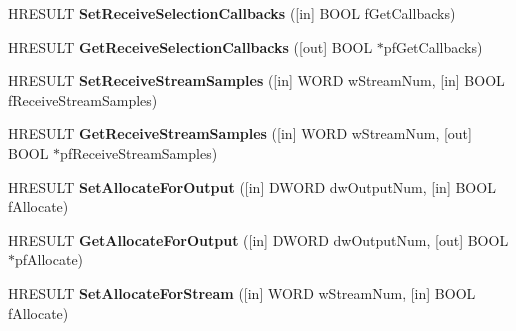 \begin{DoxyCompactItemize}
\item 
\mbox{\label{interface_i_w_m_reader_advanced_ad6e00976a9402abc437f362dbe818175}} 
H\+R\+E\+S\+U\+LT {\bfseries Set\+Receive\+Selection\+Callbacks} (\mbox{[}in\mbox{]} B\+O\+OL f\+Get\+Callbacks)
\item 
\mbox{\label{interface_i_w_m_reader_advanced_a2bcaa47c7ae313e96668711bc5ae07a7}} 
H\+R\+E\+S\+U\+LT {\bfseries Get\+Receive\+Selection\+Callbacks} (\mbox{[}out\mbox{]} B\+O\+OL $\ast$pf\+Get\+Callbacks)
\item 
\mbox{\label{interface_i_w_m_reader_advanced_afd6f48f3c6257366503224199bf64851}} 
H\+R\+E\+S\+U\+LT {\bfseries Set\+Receive\+Stream\+Samples} (\mbox{[}in\mbox{]} W\+O\+RD w\+Stream\+Num, \mbox{[}in\mbox{]} B\+O\+OL f\+Receive\+Stream\+Samples)
\item 
\mbox{\label{interface_i_w_m_reader_advanced_abea700f658070ead31fc0072ae520288}} 
H\+R\+E\+S\+U\+LT {\bfseries Get\+Receive\+Stream\+Samples} (\mbox{[}in\mbox{]} W\+O\+RD w\+Stream\+Num, \mbox{[}out\mbox{]} B\+O\+OL $\ast$pf\+Receive\+Stream\+Samples)
\item 
\mbox{\label{interface_i_w_m_reader_advanced_ae9801300714e0713e22c7917670599ac}} 
H\+R\+E\+S\+U\+LT {\bfseries Set\+Allocate\+For\+Output} (\mbox{[}in\mbox{]} D\+W\+O\+RD dw\+Output\+Num, \mbox{[}in\mbox{]} B\+O\+OL f\+Allocate)
\item 
\mbox{\label{interface_i_w_m_reader_advanced_a3b5e1b9ab2293b831cc448ab3bf2e316}} 
H\+R\+E\+S\+U\+LT {\bfseries Get\+Allocate\+For\+Output} (\mbox{[}in\mbox{]} D\+W\+O\+RD dw\+Output\+Num, \mbox{[}out\mbox{]} B\+O\+OL $\ast$pf\+Allocate)
\item 
\mbox{\label{interface_i_w_m_reader_advanced_aa88aa874671fc06cee000083f0de9f08}} 
H\+R\+E\+S\+U\+LT {\bfseries Set\+Allocate\+For\+Stream} (\mbox{[}in\mbox{]} W\+O\+RD w\+Stream\+Num, \mbox{[}in\mbox{]} B\+O\+OL f\+Allocate)
\item 
\mbox{\label{interface_i_w_m_reader_advanced_a36ca4e67cb104e719529c35b5c80d1f2}} 

\end{DoxyCompactItemize}
